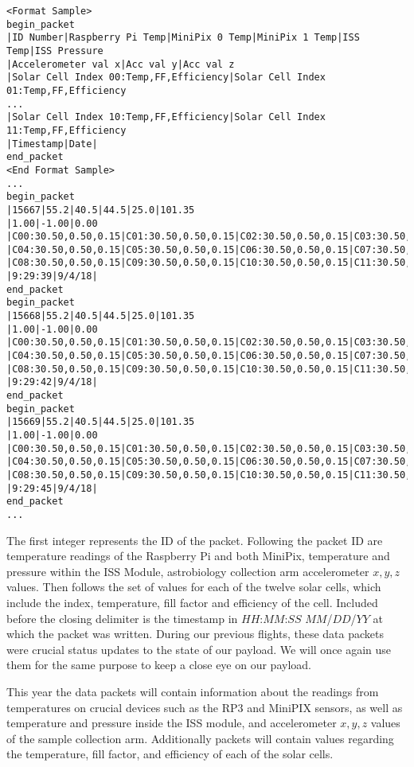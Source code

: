 \lstset{basicstyle=\small, numbers=left, xleftmargin=2em, frame=tb, label = Downlinks, framexleftmargin=1.5em}
\begin{lstlisting}[caption = Sample of proposed downlink data packets ID: 15667 - 15669]
<Format Sample>
begin_packet
|ID Number|Raspberry Pi Temp|MiniPix 0 Temp|MiniPix 1 Temp|ISS Temp|ISS Pressure
|Accelerometer val x|Acc val y|Acc val z
|Solar Cell Index 00:Temp,FF,Efficiency|Solar Cell Index 01:Temp,FF,Efficiency
...
|Solar Cell Index 10:Temp,FF,Efficiency|Solar Cell Index 11:Temp,FF,Efficiency
|Timestamp|Date|
end_packet
<End Format Sample>
...
begin_packet
|15667|55.2|40.5|44.5|25.0|101.35
|1.00|-1.00|0.00
|C00:30.50,0.50,0.15|C01:30.50,0.50,0.15|C02:30.50,0.50,0.15|C03:30.50,0.50,0.15
|C04:30.50,0.50,0.15|C05:30.50,0.50,0.15|C06:30.50,0.50,0.15|C07:30.50,0.50,0.15
|C08:30.50,0.50,0.15|C09:30.50,0.50,0.15|C10:30.50,0.50,0.15|C11:30.50,0.50,0.15
|9:29:39|9/4/18|
end_packet
begin_packet
|15668|55.2|40.5|44.5|25.0|101.35
|1.00|-1.00|0.00
|C00:30.50,0.50,0.15|C01:30.50,0.50,0.15|C02:30.50,0.50,0.15|C03:30.50,0.50,0.15
|C04:30.50,0.50,0.15|C05:30.50,0.50,0.15|C06:30.50,0.50,0.15|C07:30.50,0.50,0.15
|C08:30.50,0.50,0.15|C09:30.50,0.50,0.15|C10:30.50,0.50,0.15|C11:30.50,0.50,0.15
|9:29:42|9/4/18|
end_packet
begin_packet
|15669|55.2|40.5|44.5|25.0|101.35
|1.00|-1.00|0.00
|C00:30.50,0.50,0.15|C01:30.50,0.50,0.15|C02:30.50,0.50,0.15|C03:30.50,0.50,0.15
|C04:30.50,0.50,0.15|C05:30.50,0.50,0.15|C06:30.50,0.50,0.15|C07:30.50,0.50,0.15
|C08:30.50,0.50,0.15|C09:30.50,0.50,0.15|C10:30.50,0.50,0.15|C11:30.50,0.50,0.15
|9:29:45|9/4/18|
end_packet
...
\end{lstlisting}
\medskip

The first integer represents the ID of the packet. Following the packet ID are temperature readings of the Raspberry Pi and both MiniPix, temperature and pressure within the ISS Module, astrobiology collection arm accelerometer $x, y, z$ values. Then follows the set of values for each of the twelve solar cells, which include the index, temperature, fill factor and efficiency of the cell. Included before the closing delimiter is the timestamp in $HH$:$MM$:$SS$ $MM$/$DD$/$YY$ at which the packet was written.  
During our previous flights, these data packets were crucial status updates to the state of our payload. We will once again use them for the same purpose to keep a close eye on our payload.

This year the data packets will contain information about the readings from temperatures on crucial devices such as the RP3 and MiniPIX sensors, as well as temperature and pressure inside the ISS module, and accelerometer $x, y, z$ values of the sample collection arm. Additionally packets will contain values regarding the temperature, fill factor, and efficiency of each of the solar cells.  


